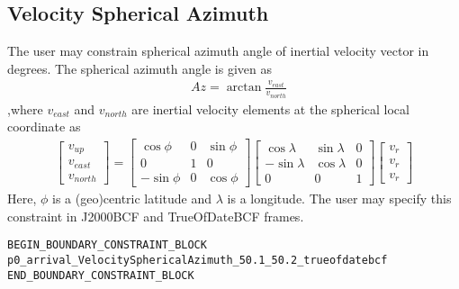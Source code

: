 \documentclass[11pt]{article}
\begin{document}
\subsection{Velocity Spherical Azimuth}
\label{subsec:velocity_sphericalazimuth}
The user may constrain spherical azimuth angle of inertial velocity vector in degrees. The spherical azimuth angle is given as
\begin{equation}
	\label{eq:velocity_Az}
	\begin{aligned}
		&Az = \arctan{\frac{v_{east}}{v_{north}}}
	\end{aligned}
\end{equation}
,where $v_{east}$ and $v_{north}$ are inertial velocity elements at the spherical local coordinate as
\begin{equation}
	\label{eq:velocity_local}
	\begin{aligned}
		\begin{bmatrix}
		v_{up}\\
		v_{east}\\
		v_{north}
		\end{bmatrix} =
		\begin{bmatrix}
		\cos{\phi} & 0 & \sin{\phi}\\
		0 & 1 & 0\\
		-\sin{\phi} & 0 & \cos{\phi}
		\end{bmatrix}
		\begin{bmatrix}
		\cos{\lambda} & \sin{\lambda} & 0\\
		-\sin{\lambda}& \cos{\lambda} & 0\\
		0 & 0 & 1
		\end{bmatrix}
		\begin{bmatrix}
		v_{r}\\
		v_{r}\\
		v_{r}
		\end{bmatrix}
	\end{aligned}
\end{equation}
Here, $\phi$ is a (geo)centric latitude and $\lambda$ is a longitude. The user may specify this constraint in J2000BCF and TrueOfDateBCF frames.

\begin{verbatim}
BEGIN_BOUNDARY_CONSTRAINT_BLOCK
p0_arrival_VelocitySphericalAzimuth_50.1_50.2_trueofdatebcf
END_BOUNDARY_CONSTRAINT_BLOCK
\end{verbatim}
\end{document}
